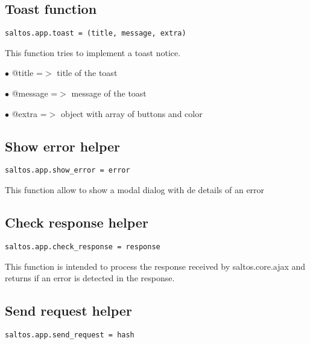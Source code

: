 \documentclass[a4paper]{book}
\begin{document}
\hypertarget{toc395}{}
\subsection{Toast function}

\begin{lstlisting}
saltos.app.toast = (title, message, extra)
\end{lstlisting}

This function tries to implement a toast notice.

\begin{compactitem}
\item[\color{myblue}$\bullet$] @title   =$>$ title of the toast
\item[\color{myblue}$\bullet$] @message =$>$ message of the toast
\item[\color{myblue}$\bullet$] @extra   =$>$ object with array of buttons and color
\end{compactitem}

\hypertarget{toc396}{}
\subsection{Show error helper}

\begin{lstlisting}
saltos.app.show_error = error
\end{lstlisting}

This function allow to show a modal dialog with de details of an error

\hypertarget{toc397}{}
\subsection{Check response helper}

\begin{lstlisting}
saltos.app.check_response = response
\end{lstlisting}

This function is intended to process the response received by saltos.core.ajax and returns
if an error is detected in the response.

\hypertarget{toc398}{}
\subsection{Send request helper}

\begin{lstlisting}
saltos.app.send_request = hash
\end{lstlisting}
\end{document}
